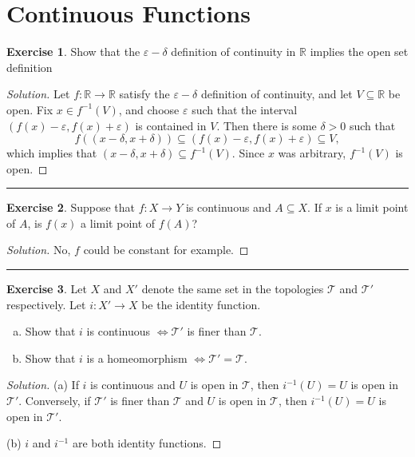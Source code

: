\documentclass{article}
\theoremstyle{definition}
\newtheorem{exercise}{Exercise}[section]
\begin{document}
\addtocounter{section}{17}
\section{Continuous Functions}

\begin{exercise}
  Show that the $\varepsilon-\delta$ definition of continuity in $\mathbb{R}$ implies the open set definition 
\end{exercise}
\begin{proof}[Solution]
  Let $f:\mathbb{R}\to\mathbb{R}$ satisfy the $\varepsilon-\delta$ definition of continuity, and let $V\subseteq \mathbb{R}$ be open. Fix $x\in f^{-1} (V)$, and choose $\varepsilon$ such that the interval $(f(x) - \varepsilon, f(x) + \varepsilon)$ is contained in $V$. Then there is some $\delta > 0$ such that
  $$f((x - \delta, x + \delta))\subseteq (f(x) - \varepsilon, f(x) + \varepsilon) \subseteq V,$$
  which implies that $(x - \delta, x + \delta)\subseteq f^{-1}(V)$. Since $x$ was arbitrary, $f^{-1}(V)$ is open.
\end{proof}

\hrule

\begin{exercise}
  Suppose that $f:X\to Y$ is continuous and $A\subseteq X$. If $x$ is a limit point of $A$, is $f(x)$ a limit point of $f(A)$?
\end{exercise}
\begin{proof}[Solution]
  No, $f$ could be constant for example.
\end{proof}

\hrule

\begin{exercise}
  Let $X$ and $X'$ denote the same set in the topologies $\mathcal{T}$ and $\mathcal{T}'$ respectively. Let $i:X'\to X$ be the identity function.
  \begin{enumerate}[(a)]
    \item Show that $i$ is continuous $\iff \mathcal{T}'$ is finer than $\mathcal{T}$.
    \item Show that $i$ is a homeomorphism $\iff \mathcal{T}' = \mathcal{T}$.
  \end{enumerate}
\end{exercise}
\begin{proof}[Solution]
  (a) If $i$ is continuous and $U$ is open in $\mathcal{T}$, then $i^{-1}(U) = U$ is open in $\mathcal{T}'$. Conversely, if $\mathcal{T}'$ is finer than $\mathcal{T}$ and $U$ is open in $\mathcal{T}$, then $i^{-1}(U) = U$ is open in $\mathcal{T}'$.

  (b) $i$ and $i^{-1}$ are both identity functions.
\end{proof}
\end{document}
